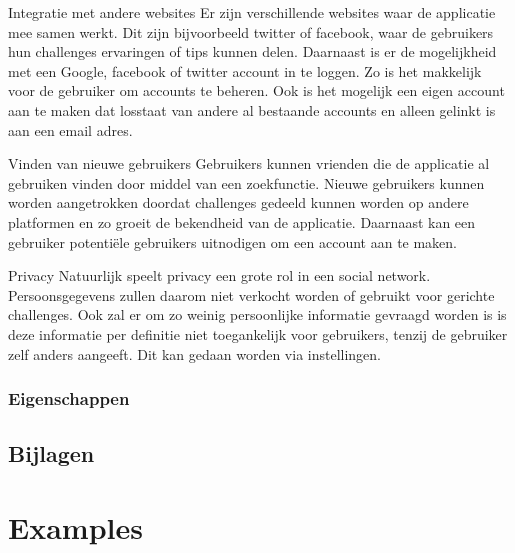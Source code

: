 \documentclass[11pt,fleqn,oneside,openany]{book} %
\begin{document}
Integratie met andere websites
Er zijn verschillende websites waar de applicatie mee samen werkt. Dit zijn bijvoorbeeld twitter of facebook, waar de gebruikers hun challenges ervaringen of tips kunnen delen. Daarnaast is er de mogelijkheid met een Google, facebook of twitter account in te loggen. Zo is het makkelijk voor de gebruiker om accounts te beheren. Ook is het mogelijk een eigen account aan te maken dat losstaat van andere al bestaande accounts en alleen gelinkt is aan een email adres.

Vinden van nieuwe gebruikers
Gebruikers kunnen vrienden die de applicatie al gebruiken vinden door middel van een zoekfunctie. Nieuwe gebruikers kunnen worden aangetrokken doordat challenges gedeeld kunnen worden op andere platformen en zo groeit de bekendheid van de applicatie. Daarnaast kan een gebruiker potentiële gebruikers uitnodigen om een account aan te maken.

Privacy
Natuurlijk speelt privacy een grote rol in een social network. Persoonsgegevens zullen daarom niet verkocht worden of gebruikt voor gerichte challenges. Ook zal er om zo weinig persoonlijke informatie gevraagd worden is is deze informatie per definitie niet toegankelijk voor gebruikers, tenzij de gebruiker zelf anders aangeeft. Dit kan gedaan worden via instellingen.

\section{Eigenschappen}


\chapter*{Bijlagen}



\part{Examples}

\end{document}
